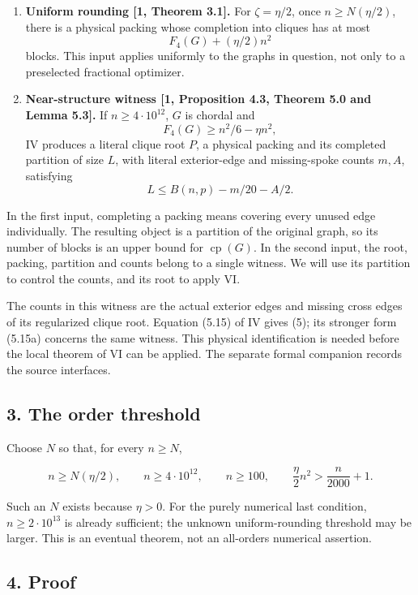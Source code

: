 \documentclass[english,11pt,a4paper]{article}
\providecommand{\tightlist}{\setlength{\itemsep}{0pt}\setlength{\parskip}{0pt}}
\begin{document}
\begin{enumerate}
\def\labelenumi{\arabic{enumi}.}
\tightlist
\item
  \textbf{Uniform rounding {[}1, Theorem 3.1{]}.} For \(\zeta=\eta/2\),
  once \(n\ge N(\eta/2)\), there is a physical packing whose completion
  into cliques has at most \[
  F_4(G)+(\eta/2)n^2
  \] blocks. This input applies uniformly to the graphs in question, not
  only to a preselected fractional optimizer.
\item
  \textbf{Near-structure witness {[}1, Proposition 4.3, Theorem 5.0 and
  Lemma 5.3{]}.} If \(n\ge4\cdot10^{12}\), \(G\) is chordal and \[
  F_4(G)\ge n^2/6-\eta n^2,
  \] IV produces a literal clique root \(P\), a physical packing and its
  completed partition of size \(L\), with literal exterior-edge and
  missing-spoke counts \(m,A\), satisfying \[
  L\le B(n,p)-m/20-A/2.
  \tag{5}
  \]
\end{enumerate}

In the first input, completing a packing means covering every unused
edge individually. The resulting object is a partition of the original
graph, so its number of blocks is an upper bound for
\(\operatorname{cp}(G)\). In the second input, the root, packing,
partition and counts belong to a single witness. We will use its
partition to control the counts, and its root to apply VI.

The counts in this witness are the actual exterior edges and missing
cross edges of its regularized clique root. Equation (5.15) of IV gives
(5); its stronger form (5.15a) concerns the same witness. This physical
identification is needed before the local theorem of VI can be applied.
The separate formal companion records the source interfaces.

\subsection{3. The order threshold}\label{the-order-threshold}

Choose \(N\) so that, for every \(n\ge N\),

\[
n\ge N(\eta/2),\qquad n\ge4\cdot10^{12},\qquad n\ge100,
\qquad \frac\eta2n^2>\frac n{2000}+1.
\tag{6}
\]

Such an \(N\) exists because \(\eta>0\). For the purely numerical last
condition, \(n\ge2\cdot10^{13}\) is already sufficient; the unknown
uniform-rounding threshold may be larger. This is an eventual theorem,
not an all-orders numerical assertion.

\subsection{4. Proof}\label{proof}
\end{document}

